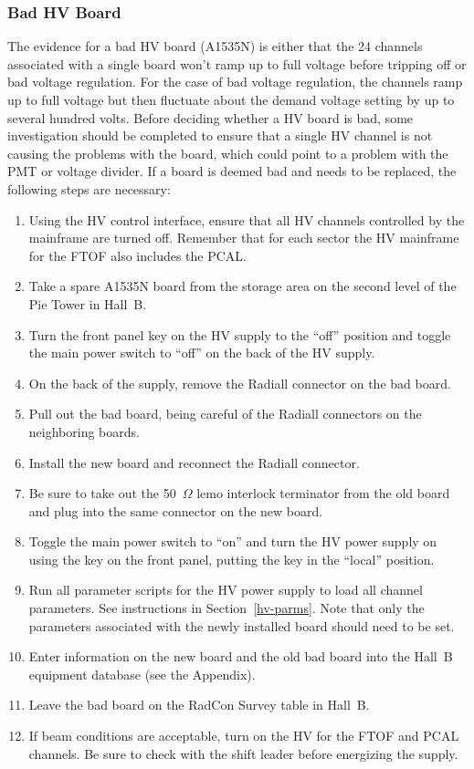 \documentclass[12pt]{article}
\begin{document}
\subsubsection{Bad HV Board}
\label{board-swap}

The evidence for a bad HV board (A1535N) is either that the 24 channels associated 
with a single board won't ramp up to full voltage before tripping off or bad voltage 
regulation. For the case of bad voltage regulation, the channels ramp up to full 
voltage but then fluctuate about the demand voltage setting by up to several hundred 
volts. Before deciding whether a HV board is bad, some investigation should be 
completed to ensure that a single HV channel is not causing the problems with the 
board, which could point to a problem with the PMT or voltage divider. If a board is 
deemed bad and needs to be replaced, the following steps are necessary:

\begin{enumerate}
\item Using the HV control interface, ensure that all HV channels controlled by the
mainframe are turned off. Remember that for each sector the HV mainframe for the FTOF
also includes the PCAL.
\item Take a spare A1535N board from the storage area on the second level of the Pie 
Tower in Hall~B.
\item Turn the front panel key on the HV supply to the ``off'' position and toggle 
the main power switch to ``off'' on the back of the HV supply.
\item On the back of the supply, remove the Radiall connector on the bad board.
\item Pull out the bad board, being careful of the Radiall connectors on the neighboring 
boards.
\item Install the new board and reconnect the Radiall connector.
\item Be sure to take out the 50~$\Omega$ lemo interlock terminator from the old board 
and plug into the same connector on the new board.
\item Toggle the main power switch to ``on'' and turn the HV power supply on using the 
key on the front panel, putting the key in the ``local'' position.
\item Run all parameter scripts for the HV power supply to load all channel parameters. 
See instructions in Section~\ref{hv-parms}. Note that only the parameters associated 
with the newly installed board should need to be set.
\item Enter information on the new board and the old bad board into the Hall~B equipment 
database (see the Appendix).
\item Leave the bad board on the RadCon Survey table in Hall~B.
\item If beam conditions are acceptable, turn on the HV for the FTOF and PCAL channels. 
Be sure to check with the shift leader before energizing the supply.
\end{enumerate}
\end{document}
